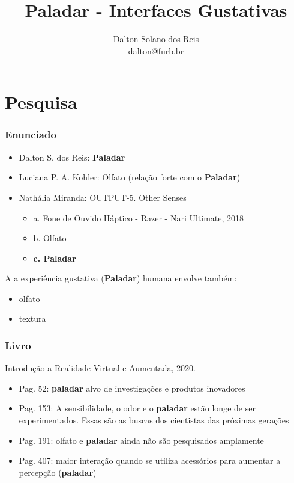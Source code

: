 \documentclass{beamer}
\title[Paladar - Interfaces Gustativas]{Paladar - Interfaces Gustativas}
\author[Dalton Solano dos Reis]{
  Dalton Solano dos Reis\texorpdfstring{\\\medskip}{}%
  {\small \href{mailto:dalton@furb.br}{dalton@furb.br}}}
\institute[UDESC]{
  Centro de Ciências e Tecnológicas\\
  Universidade do Estado de Santa Catarina}
\begin{document}
\begin{frame}
  \titlepage

\end{frame}

\section{Pesquisa}
\begin{frame}
  \frametitle{Enunciado}
  \begin{itemize}
    \item Dalton S. dos Reis: \textbf{Paladar}
    \item Luciana P. A. Kohler: Olfato (relação forte com o \textbf{Paladar})  
    \item Nathália Miranda: OUTPUT-5. Other Senses
    \begin{itemize}
      \item a. Fone de Ouvido Háptico - Razer - Nari Ultimate, 2018
      \item b. Olfato
      \item \textbf{c. Paladar}  
    \end{itemize} 
  \end{itemize}
  A a experiência gustativa (\textbf{Paladar}) humana envolve também:
  \begin{itemize}
    \item olfato
    \item textura
  \end{itemize}
\end{frame}

\begin{frame}
  \frametitle{Livro}
  Introdução a Realidade Virtual e Aumentada, 2020. \\
  \begin{itemize}
    \item Pag. 52: \textbf{paladar} alvo de investigações e produtos inovadores
    \item Pag. 153: A sensibilidade, o odor e o \textbf{paladar} estão longe de ser experimentados. Essas são as buscas dos cientistas das próximas gerações
    \item Pag. 191: olfato e \textbf{paladar} ainda não são pesquisados amplamente
    \item Pag. 407: maior interação quando se utiliza acessórios para aumentar a percepção (\textbf{paladar})
  \end{itemize}
  \begin{flushright}
    \scriptsize
    \cite{toriIntroducaoRealidadeVirtual2020}
  \end{flushright}
\end{frame}
\end{document}
